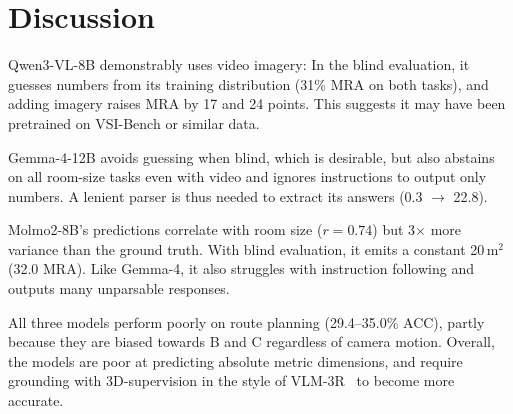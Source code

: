 \documentclass{article}
\begin{document}
\section{Discussion}
Qwen3-VL-8B demonstrably uses video imagery: In the blind evaluation, it guesses numbers from its training
distribution (31\% MRA on both tasks), and adding imagery raises MRA by 17 and 24 points.
This suggests it may have been pretrained on VSI-Bench or similar data.

Gemma-4-12B avoids guessing when blind, which is desirable, but also abstains on all room-size
tasks even with video and ignores instructions to output only numbers. A lenient parser is thus
needed to extract its answers (0.3 $\rightarrow$ 22.8).

Molmo2-8B's predictions correlate with room size ($r=0.74$) but 3$\times$ more variance than the
ground truth. With blind evaluation, it emits a constant 20\,m$^2$ (32.0 MRA). Like Gemma-4,
it also struggles with instruction following and outputs many unparsable responses.

All three  models perform poorly on route planning (29.4--35.0\% ACC), partly because they are biased towards B and C 
regardless of camera motion. Overall, the models are poor at predicting absolute metric dimensions, and require
grounding with 3D-supervision in the style of  VLM-3R~\citep{fan2026vlm3r} to become more accurate.

\vspace{-5pt}

\begingroup
\fontsize{5.6}{6.3}\selectfont
\setlength{\bibsep}{0pt}
\setlength{\parskip}{0pt}

\endgroup
\end{document}
